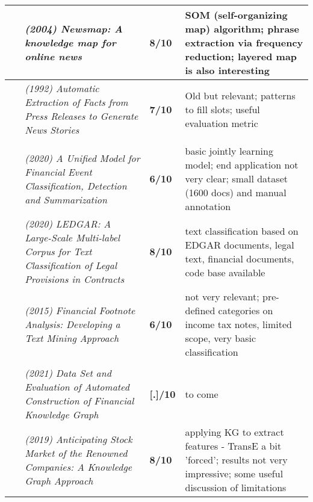 \documentclass[10pt]{article}
\begin{document}
\begin{landscape}
\begin{longtable}{ |m{2em}|m{28em}|m{3em}|m{24em}| }
~\cite{2004_extraction_newsmap} & \emph{(2004) Newsmap: A knowledge map for online news}
& \textbf{8/10} & SOM (self-organizing map) algorithm; phrase extraction via frequency reduction; layered map is also interesting \\
 \hline

~\cite{1992_extraction_generatenews} & \emph{(1992) Automatic Extraction of Facts from Press Releases to Generate News Stories}
& \textbf{7/10} & Old but relevant; patterns to fill slots; useful evaluation metric\\
 \hline 


\rowcolor{lightgray}\multicolumn{4}{|l|}{Text Classification} \\
 \hline 

~\cite{2020_unifiedmodel} &\emph{(2020) A Unified Model for Financial Event Classification, Detection and Summarization}
& \textbf{6/10} & basic jointly learning model; end application not very clear; small dataset (1600 docs) and manual annotation\\
 \hline 

~\cite{2020_ledgar} & \emph{(2020) {LEDGAR}: A Large-Scale Multi-label Corpus for Text Classification of Legal Provisions in Contracts}
& \textbf{8/10} & text classification based on EDGAR documents, legal text, financial documents, code base available\\
 \hline 

~\cite{2015_taxnotes} & \emph{(2015) Financial Footnote Analysis: Developing a Text Mining Approach}
& \textbf{6/10} & not very relevant; pre-defined categories on income tax notes, limited scope, very basic classification\\
 \hline 


\rowcolor{lightgray}\multicolumn{4}{|l|}{Knowledge Graph} \\
 \hline 

~\cite{2021_KG_researchreport} & \emph{(2021) Data Set and Evaluation of Automated Construction of Financial Knowledge Graph}
& \textbf{[.]/10} & to come\\
 \hline 

~\cite{2019_KG_finNews_price} & \emph{(2019) Anticipating Stock Market of the Renowned Companies: A Knowledge Graph Approach}
& \textbf{8/10} & applying KG to extract features - TransE a bit 'forced'; results not very impressive; some useful discussion of limitations\\
 \hline 


\end{longtable}
\end{landscape}
\end{document}
